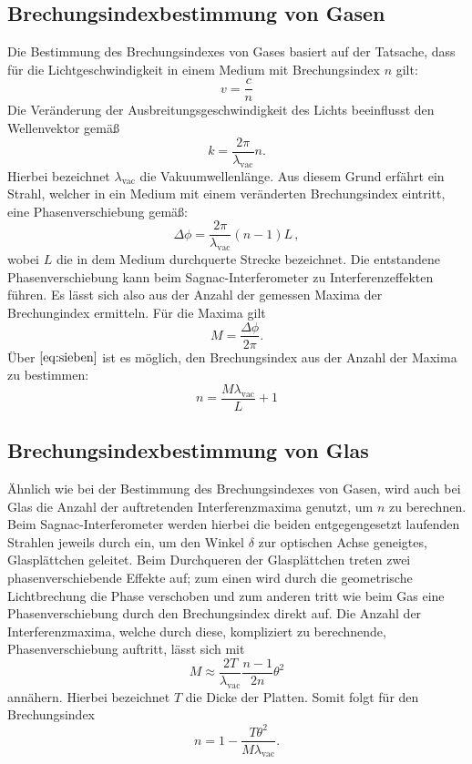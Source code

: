 \subsection{Brechungsindexbestimmung von Gasen}
Die Bestimmung des Brechungsindexes von Gases basiert auf der Tatsache, dass für die Lichtgeschwindigkeit in einem Medium mit Brechungsindex $n$ gilt:
\begin{equation}
  v=\frac{c}{n}
\end{equation}
Die Veränderung der Ausbreitungsgeschwindigkeit des Lichts beeinflusst den Wellenvektor gemäß
\begin{equation}
  k = \frac{2\pi}{\lambda_{\text{vac}}}n.
\end{equation}
Hierbei bezeichnet $\lambda_{\text{vac}}$ die Vakuumwellenlänge.
Aus diesem Grund erfährt ein Strahl, welcher in ein Medium mit einem veränderten Brechungsindex eintritt, eine Phasenverschiebung gemäß:
\begin{equation}
  \Delta \phi= \frac{2\pi}{\lambda_{\text{vac}}}(n-1)L \, ,
  \label{eq:sieben}
\end{equation}
wobei  $L$ die in dem Medium durchquerte Strecke bezeichnet. Die entstandene Phasenverschiebung kann beim Sagnac-Interferometer zu Interferenzeffekten führen. Es lässt sich also
aus der Anzahl der gemessen Maxima der Brechungindex ermitteln. Für die Maxima gilt
\begin{equation}
  M = \frac{\Delta \phi}{2 \pi}.
\end{equation}
Über $\ref{eq:sieben}$ ist es möglich, den Brechungsindex aus der Anzahl der Maxima zu bestimmen:
\begin{equation}
  n=\frac{M\lambda_{\text{vac}}}{L}+1
  \label{eq:gas}
\end{equation}
\subsection{Brechungsindexbestimmung von Glas}
Ähnlich wie bei der Bestimmung des Brechungsindexes von Gasen, wird auch bei Glas die Anzahl der auftretenden Interferenzmaxima genutzt, um $n$ zu berechnen. Beim Sagnac-Interferometer
werden hierbei die beiden entgegengesetzt laufenden Strahlen jeweils durch ein, um den Winkel $\delta$ zur optischen Achse geneigtes, Glasplättchen geleitet. Beim Durchqueren
der Glasplättchen treten zwei phasenverschiebende Effekte auf; zum einen wird durch die geometrische Lichtbrechung die Phase verschoben und zum anderen tritt wie beim
Gas eine Phasenverschiebung durch den Brechungsindex direkt auf.
Die Anzahl der Interferenzmaxima, welche durch diese, kompliziert zu berechnende, Phasenverschiebung auftritt, lässt  sich mit
\begin{equation}
  M \approx \frac{2T}{\lambda_{\text{vac}}}\frac{n-1}{2n}\theta^2
\end{equation}
annähern. Hierbei bezeichnet $T$ die Dicke der Platten. Somit folgt für den Brechungsindex
\begin{equation}
  n=1-\frac{T\theta^2}{M\lambda_{\text{vac}}}.
  \label{eq:glas}
\end{equation}
